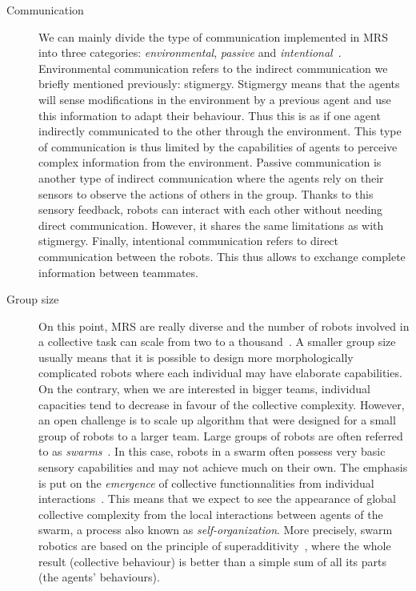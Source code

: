 \begin{description}
      \item[Communication] {We can mainly divide the type of communication implemented in MRS into three categories: \emph{environmental}, \emph{passive} and \emph{intentional}~\parencite{Cao1997, Parker2008}. Environmental communication refers to the indirect communication we briefly mentioned previously: stigmergy. Stigmergy means that the agents will sense modifications in the environment by a previous agent and use this information to adapt their behaviour. Thus this is as if one agent indirectly communicated to the other through the environment. This type of communication is thus limited by the capabilities of agents to perceive complex information from the environment. Passive communication is another type of indirect communication where the agents rely on their sensors to observe the actions of others in the group. Thanks to this sensory feedback, robots can interact with each other without needing direct communication. However, it shares the same limitations as with stigmergy. Finally, intentional communication refers to direct communication between the robots. This thus allows to exchange complete information between teammates.}

      \item[Group size] {On this point, MRS are really diverse and the number of robots involved in a collective task can scale from two to a thousand~\parencite{Rubenstein2014}. A smaller group size usually means that it is possible to design more morphologically complicated robots where each individual may have elaborate capabilities. On the contrary, when we are interested in bigger teams, individual capacities tend to decrease in favour of the collective complexity. However, an open challenge is to scale up algorithm that were designed for a small group of robots to a larger team. Large groups of robots are often referred to as \emph{swarms}~\parencite{Beni2005}. In this case, robots in a swarm often possess very basic sensory capabilities and may not achieve much on their own. The emphasis is put on the \emph{emergence} of collective functionnalities from individual interactions~\parencite{Kube1993, Parker2008}. This means that we expect to see the appearance of global collective complexity from the local interactions between agents of the swarm, a process also known as \emph{self-organization}. More precisely, swarm robotics are based on the principle of superadditivity~\parencite{Parker2008}, where the whole result (collective behaviour) is better than a simple sum of all its parts (the agents' behaviours).}
    \end{description}

